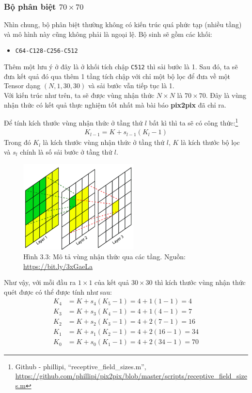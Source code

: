 \documentclass[a4paper]{article}
\begin{document}
\subsubsection{Bộ phân biệt $70 \times 70$}
Nhìn chung, bộ phân biệt thường không có kiến trúc quá phức tạp (nhiều tầng) và mô hình này cũng không phải là ngoại lệ. Bộ sinh sẽ gồm các khối:

\begin{itemize}
    \item \texttt{C64-C128-C256-C512}
\end{itemize}

\noindent
Thêm một lưu ý ở đây là ở khối tích chập \texttt{C512} thì sải bước là 1. Sau đó, ta sẽ đưa kết quả đó qua thêm 1 tầng tích chập với chỉ một bộ lọc để đưa về một Tensor dạng $(N, 1, 30, 30)$ và sải bước vẫn tiếp tục là 1.\\
Với kiến trúc như trên, ta sẽ được vùng nhận thức $N \times N$ là $70 \times 70$. Đây là vùng nhận thức có kết quả thực nghiệm tốt nhất mà bài báo \textbf{pix2pix} đã chỉ ra.

\noindent
Để tính kích thước vùng nhận thức ở tầng thứ $l$ bất kì thì ta sẽ có công thức:\footnote{Github - phillipi, ``receptive\_field\_sizes.m'', \href{https://github.com/phillipi/pix2pix/blob/master/scripts/receptive\_field\_sizes.m}{https://github.com/phillipi/pix2pix/blob/master/scripts/receptive\_field\_sizes.m}}
\begin{align*}
    K_{l-1} = K + s_{l-1}(K_{l} - 1)
\end{align*}
Trong đó $K_l$ là kích thước vùng nhận thức ở tầng thứ $l$, $K$ là kích thước bộ lọc và $s_{l}$ chính là số sải bước ở tầng thứ $l$.

\begin{figure}[h!]
\centering
\includegraphics[width=6cm]{images/3_3.png}
\caption{Hình 3.3: Mô tả vùng nhận thức qua các tầng. Nguồn: \href{https://bit.ly/3xGaeLa}{https://bit.ly/3xGaeLa}}
\end{figure}

\noindent
Như vậy, với mỗi đầu ra $1 \times 1$ của kết quả $30\times 30$ thì kích thước vùng nhận thức quét được có thể được tính như sau:
\begin{align*}
    K_4 &= K + s_4(K_5 - 1) = 4 + 1(1-1) = 4\\
    K_3 &= K + s_3(K_4 - 1) = 4 + 1(4-1) = 7\\
    K_2 &= K + s_2(K_3 - 1) = 4 + 2(7-1) = 16\\
    K_1 &= K + s_1(K_2 - 1) = 4 + 2(16-1) = 34\\
    K_0 &= K + s_0(K_1 - 1) = 4 + 2(34 - 1) = 70
\end{align*}
\end{document}
